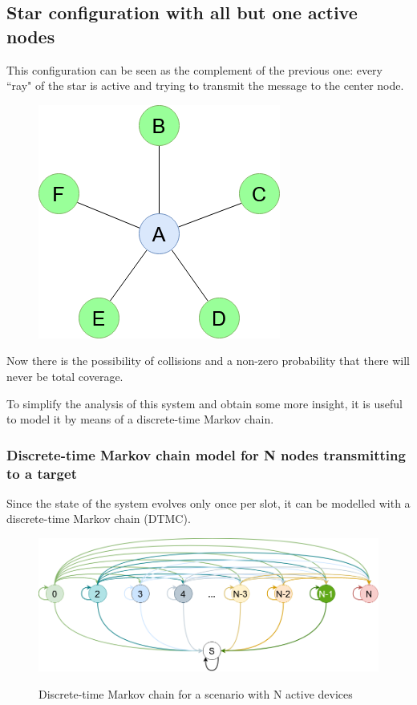 \subsection{Star configuration with all but one active nodes}
\label{ssec:star2}

This configuration can be seen as the complement of the previous one: every ``ray" of the star is active and trying to transmit the message to the center node.

\begin{figure}[H]%
    \centering
	{{\includegraphics[scale=0.5]{img/star_graph2.png} }}%
    \caption{}%
    \label{fig:star_graph}%
\end{figure}

Now there is the possibility of collisions and a non-zero probability that there will never be total coverage.

To simplify the analysis of this system and obtain some more insight, it is useful to model it by means of a discrete-time Markov chain.

\subsubsection{Discrete-time Markov chain model for N nodes transmitting to a target}
Since the state of the system evolves only once per slot, it can be modelled with a discrete-time Markov chain (DTMC).
\hfill \break
\hfill \break

\begin{figure}[H]%
    \centering
	{{\includegraphics[scale=0.4]{img/DTMC.png} }}%
    \caption{Discrete-time Markov chain for a scenario with N active devices}%
    \label{fig:dtmc}%
\end{figure}

